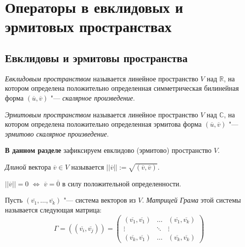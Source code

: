 \section{Операторы в евклидовых и эрмитовых пространствах}

\subsection{Евклидовы и эрмитовы пространства}

\begin{definition}
	\textit{Евклидовым пространством} называется линейное пространство $V$ над $\mathbb{R}$, на котором определена положительно определенная симметрическая билинейная форма $(\overline{u}, \overline{v})$ "--- \textit{скалярное произведение}.
\end{definition}

\begin{definition}
	\textit{Эрмитовым пространством} называется линейное пространство $V$ над $\mathbb{C}$, на котором определена положительно определенная эрмитова форма $(\overline{u}, \overline{v})$ "--- \textit{эрмитово скалярное произведение}.
\end{definition}

\textbf{В данном разделе} зафиксируем евклидово (эрмитово) пространство $V$.

\begin{definition}
	\textit{Длиной} вектора $\overline{v} \in V$ называется $||\overline{v}|| := \sqrt{(\overline{v}, \overline{v})}$.
\end{definition}

\begin{note}
	$||\overline{v}|| = 0$ $\Leftrightarrow$ $\overline{v} = \overline{0}$ в силу положительной определенности.
\end{note}

\begin{definition}
	Пусть $(\overline{v_1}, \dots, \overline{v_k})$ "--- система векторов из $V$. \textit{Матрицей Грама} этой системы называется следующая матрица:
	\[\Gamma = ((\overline{v_i}, \overline{v_j})) = \begin{pmatrix}(\overline{v_1}, \overline{v_1}) & \dots & (\overline{v_1}, \overline{v_k})\\
		\vdots & \ddots & \vdots\\
		(\overline{v_k}, \overline{v_1}) & \dots & (\overline{v_k}, \overline{v_k})
	\end{pmatrix}\]
\end{definition}

